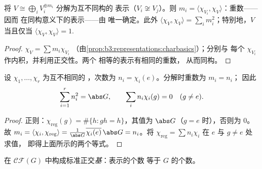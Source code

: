 \begin{corollary}\label{cor:b3:representations:multiplicity}
将 $V \cong \bigoplus_i V_i^{\oplus m_i}$ 分解为互不同构的
表示（$V_i \not\cong V_j$）。则 $m_i = \langle
\chi_{V_i}, \chi_V\rangle$：重数——因而
在同构意义下的表示——由
唯一确定。此外 $\langle \chi_V, \chi_V\rangle = \sum_i
m_i^2$；特别地，$V$ 当且仅当 $\langle\chi_V,
\chi_V\rangle = 1$.
\end{corollary}

\begin{proof}
$\chi_V = \sum m_i\chi_{V_i}$
（由\cref{prop:b3:representations:charbasics}）；分别与
每个 $\chi_{V_i}$ 作内积，并利用正交性。两个
相等的表示有相同的重数，
从而同构。
\end{proof}

\begin{theorem}[正则表示]
\label{thm:b3:representations:regular}
设 $\chi_1, \dots, \chi_r$ 为互不相同的
，次数为 $n_i = \chi_i(e)$。分解时重数为 $m_i = n_i$；
因此
\[
\sum_{i=1}^{r} n_i^2 = \abs G,
\qquad
\sum_i n_i\chi_i(g) = 0 \quad (g \neq e).
\]
\end{theorem}

\begin{proof}
正则：$\chi_{\mathrm{reg}}(g) =
\#\{h : gh = h\}$，其值为 $\abs G$（$g = e$ 时），否则为 $0$。
故 $m_i = \langle \chi_i,\chi_{\mathrm{reg}}\rangle =
\frac1{\abs G}\overline{\chi_i(e)}\,\abs G = n_i$。将
$\chi_{\mathrm{reg}} = \sum n_i\chi_i$ 在 $e$ 与 $g \neq e$ 处求值，
即得上面所示的两个等式。
\end{proof}

\begin{theorem}\label{thm:b3:representations:numberirr}
在
$\mathcal{CF}(G)$ 中构成标准正交\emph{基}：表示的个数
等于 $G$ 的个数。
\end{theorem}

